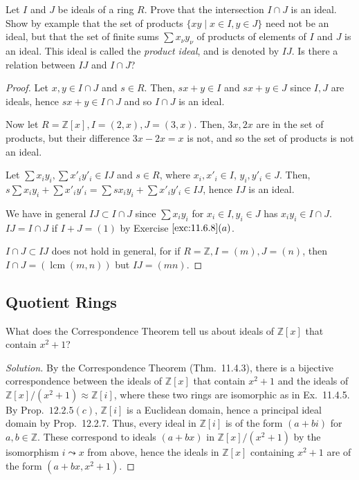\documentclass[12pt]{article}
\theoremstyle{remark}
\begin{document}
\begin{problem}\label{exc:11.3.13}
  Let $I$ and $J$ be ideals of a ring $R$. Prove that the intersection $I \cap J$ is an ideal. Show by example that the set of products $\{xy \mid x \in I, y \in J\}$ need not be an ideal, but that the set of finite sums $\sum x_\nu y_\nu$ of products of elements of $I$ and $J$ is an ideal. This ideal is called the \emph{product ideal}, and is denoted by $IJ$. Is there a relation between $IJ$ and $I \cap J$?
\end{problem}
\begin{proof}
  Let $x,y \in I \cap J$ and $s \in R$. Then, $sx + y \in I$ and $sx + y \in J$ since $I,J$ are ideals, hence $sx + y \in I \cap J$ and so $I \cap J$ is an ideal.
  \par Now let $R = \mathbb{Z}[x],I = (2,x),J = (3,x)$. Then, $3x,2x$ are in the set of products, but their difference $3x - 2x = x$ is not, and so the set of products is not an ideal.
  \par Let $\sum x_i y_i,\sum x'_i y'_i \in IJ$ and $s \in R$, where $x_i,x'_i \in I$, $y_i,y'_i \in J$. Then, $s\sum x_i y_i+\sum x'_i y'_i = \sum sx_iy_i + \sum x'_i y'_i \in IJ$, hence $IJ$ is an ideal.
  \par We have in general $IJ \subset I \cap J$ since $\sum x_i y_i$ for $x_i \in I,y_i \in J$ has $x_iy_i\in I \cap J$. $IJ = I \cap J$ if $I + J = (1)$ by Exercise $\ref{exc:11.6.8}(a)$.
  \par $I \cap J \subset IJ$ does not hold in general, for if $R = \mathbb{Z},I = (m),J = (n)$, then $I \cap J = (\operatorname{lcm}(m,n))$ but $IJ = (mn)$.
\end{proof}

\subsection{Quotient Rings}
\setcounter{subsubsection}{1}
\begin{problem}
  What does the Correspondence Theorem tell us about ideals of $\mathbb{Z}[x]$ that contain $x^2+1$?
\end{problem}
\begin{proof}[Solution]
  By the Correspondence Theorem (Thm.~11.4.3), there is a bijective correspondence between the ideals of $\mathbb{Z}[x]$ that contain $x^2+1$ and the ideals of $\mathbb{Z}[x]/(x^2+1) \approx \mathbb{Z}[i]$, where these two rings are isomorphic as in Ex.~11.4.5. By Prop.~$12.2.5(c)$, $\mathbb{Z}[i]$ is a Euclidean domain, hence a principal ideal domain by Prop.~12.2.7. Thus, every ideal in $\mathbb{Z}[i]$ is of the form $(a+bi)$ for $a,b \in \mathbb{Z}$. These correspond to ideals $(a+bx)$ in $\mathbb{Z}[x]/(x^2+1)$ by the isomorphism $i \leadsto x$ from above, hence the ideals in $\mathbb{Z}[x]$ containing $x^2 + 1$ are of the form $(a+bx,x^2+1)$.
\end{proof}
\end{document}

